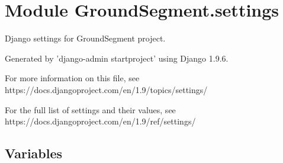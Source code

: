 %
%
%


\section{Module GroundSegment.settings}

    \label{GroundSegment:settings}
Django settings for GroundSegment project.

Generated by 'django-admin startproject' using Django 1.9.6.

For more information on this file, see 
https://docs.djangoproject.com/en/1.9/topics/settings/

For the full list of settings and their values, see 
https://docs.djangoproject.com/en/1.9/ref/settings/



  \subsection{Variables}

